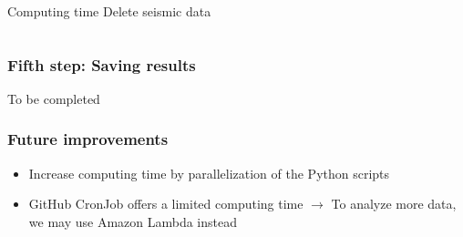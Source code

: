 \documentclass{beamer}
\begin{document}
\begin{frame}
\begin{columns}[c]
\begin{column}{5cm}
\begin{block}{Computing time}
				Delete seismic data
				\end{block}
			\end{column}
		\end{columns}


%
%
	\end{frame}

	\begin{frame}
		\frametitle{Fifth step: Saving results}
		To be completed
	\end{frame}

	\begin{frame}
		\frametitle{Future improvements}
		\begin{itemize}
			\item Increase computing time by parallelization of the Python scripts
			\item GitHub CronJob offers a limited computing time $\rightarrow$ To analyze more data, we may use Amazon Lambda instead
		\end{itemize}
	\end{frame}

%
%
%
%
%
%
%
%
%
\end{document}
